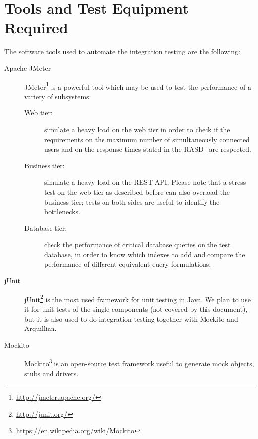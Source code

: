\chapter{Tools and Test Equipment Required}
\label{chap:tools}

The software tools used to automate the integration testing are the following:
\begin{description}
    \item[Apache JMeter
    ]
    JMeter\footnote{\url{http://jmeter.apache.org/}} is a powerful tool which may be used to test the performance of a variety of subsystems:
    \begin{description}
        \item[Web tier:] simulate a heavy load on the web tier in order to check if the requirements on the maximum number of simultaneously connected users and on the response times stated in the RASD~\cite[p.~57]{mytaxi-rasd} are respected.
        \item[Business tier:] simulate a heavy load on the REST API. Please note that a stress test on the web tier as described before can also overload the business tier; tests on both sides are useful to identify the bottlenecks.
        \item[Database tier:] check the performance of critical database queries on the test database, in order to know which indexes to add and compare the performance of different equivalent query formulations.
    \end{description}

    \item[jUnit] jUnit\footnote{\url{http://junit.org/}} is the most used framework for unit testing in Java. We plan to use it for unit tests of the single components (not covered by this document), but it is also used to do integration testing together with Mockito and Arquillian.

    \item[Mockito] Mockito\footnote{\url{https://en.wikipedia.org/wiki/Mockito}} is an open-source test framework useful to generate mock objects, stubs and drivers.

\end{description}
